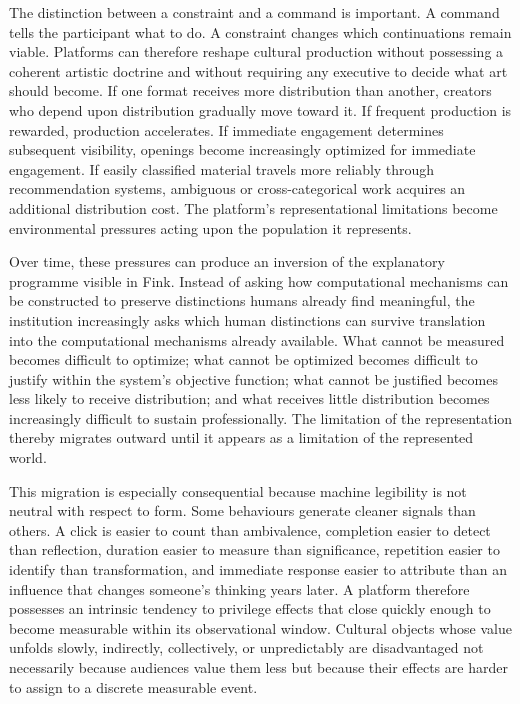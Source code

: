 \documentclass[11pt]{article}
\begin{document}
The distinction between a constraint and a command is important. A command tells the participant what to do. A constraint changes which continuations remain viable. Platforms can therefore reshape cultural production without possessing a coherent artistic doctrine and without requiring any executive to decide what art should become. If one format receives more distribution than another, creators who depend upon distribution gradually move toward it. If frequent production is rewarded, production accelerates. If immediate engagement determines subsequent visibility, openings become increasingly optimized for immediate engagement. If easily classified material travels more reliably through recommendation systems, ambiguous or cross-categorical work acquires an additional distribution cost. The platform's representational limitations become environmental pressures acting upon the population it represents.

Over time, these pressures can produce an inversion of the explanatory programme visible in Fink. Instead of asking how computational mechanisms can be constructed to preserve distinctions humans already find meaningful, the institution increasingly asks which human distinctions can survive translation into the computational mechanisms already available. What cannot be measured becomes difficult to optimize; what cannot be optimized becomes difficult to justify within the system's objective function; what cannot be justified becomes less likely to receive distribution; and what receives little distribution becomes increasingly difficult to sustain professionally. The limitation of the representation thereby migrates outward until it appears as a limitation of the represented world.

This migration is especially consequential because machine legibility is not neutral with respect to form. Some behaviours generate cleaner signals than others. A click is easier to count than ambivalence, completion easier to detect than reflection, duration easier to measure than significance, repetition easier to identify than transformation, and immediate response easier to attribute than an influence that changes someone's thinking years later. A platform therefore possesses an intrinsic tendency to privilege effects that close quickly enough to become measurable within its observational window. Cultural objects whose value unfolds slowly, indirectly, collectively, or unpredictably are disadvantaged not necessarily because audiences value them less but because their effects are harder to assign to a discrete measurable event.
\end{document}
